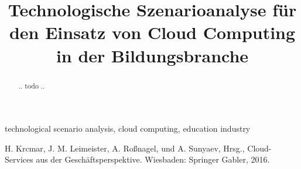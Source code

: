 \documentclass[conference]{IEEEtran}
\begin{document}
\title{Technologische Szenarioanalyse für den Einsatz von Cloud Computing in der Bildungsbranche}

\author{
}

\maketitle

\begin{abstract}
.. todo ..
\end{abstract}

\begin{IEEEkeywords}
technological scenario analysis, cloud computing, education industry
\end{IEEEkeywords}


\begin{thebibliography}{00}
 H. Krcmar, J. M. Leimeister, A. Roßnagel, und A. Sunyaev, Hrsg., Cloud-Services aus der Geschäftsperspektive. Wiesbaden: Springer Gabler, 2016.
\end{thebibliography}
\end{document}
